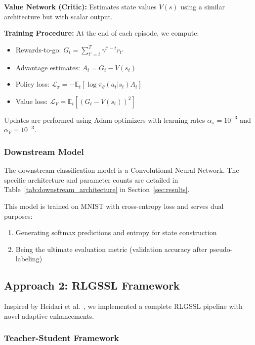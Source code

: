\documentclass{scrartcl}
\begin{document}
\textbf{Value Network (Critic):} Estimates state values $V(s)$ using a similar architecture but with scalar output.

\textbf{Training Procedure:} At the end of each episode, we compute:
\begin{itemize}
    \item Rewards-to-go: $G_t = \sum_{t'=t}^T \gamma^{t'-t} r_{t'}$
    \item Advantage estimates: $A_t = G_t - V(s_t)$
    \item Policy loss: $\mathcal{L}_\pi = -\mathbb{E}_t[\log \pi_\theta(a_t|s_t) A_t]$
    \item Value loss: $\mathcal{L}_V = \mathbb{E}_t[(G_t - V(s_t))^2]$
\end{itemize}

Updates are performed using Adam optimizers with learning rates $\alpha_\pi = 10^{-3}$ and $\alpha_V = 10^{-3}$.

\subsubsection{Downstream Model}

The downstream classification model is a Convolutional Neural Network. The specific architecture and parameter counts are detailed in Table~\ref{tab:downstream_architecture} in Section~\ref{sec:results}.

This model is trained on MNIST with cross-entropy loss and serves dual purposes:
\begin{enumerate}
    \item Generating softmax predictions and entropy for state construction
    \item Being the ultimate evaluation metric (validation accuracy after pseudo-labeling)
\end{enumerate}

\subsection{Approach 2: RLGSSL Framework}

Inspired by Heidari et al.~\cite{heidari2024rlgssl}, we implemented a complete RLGSSL pipeline with novel adaptive enhancements.

\subsubsection{Teacher-Student Framework}
\end{document}
